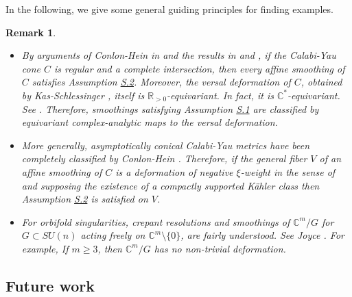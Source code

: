 \documentclass[a4paper,11pt]{article}
\newcounter{mythm}[section]
\newtheorem{rem}[mythm]{Remark}
\def\C{\mathbb{C}}
\def\R{\mathbb{R}}
\begin{document}
In the following, we give some general guiding principles for finding examples.
\begin{rem} \label{rem ex}
\hfill
\begin{itemize}
\item By arguments of Conlon-Hein in \cite[Section 5.1]{conlon2013asymptotically} and the results in \cite[Theorem A]{conlon2015asymptotically} and \cite[Theorem A, Theroem B]{conlon_classification_2024}, if the Calabi-Yau cone $C$ is regular and a complete intersection, then every affine smoothing of $C$ satisfies Assumption \hyperlink{S.2}{S.2}. Moreover, the versal deformation of $C$, obtained by Kas-Schlessinger \cite{KasSchlessinger}, itself is $\R_{>0}$-equivariant. In fact, it is $\C^*$-equivariant. See \cite[Theorem 2.5, remark 1) p.12-13]{MR584445}. Therefore, smoothings satisfying Assumption \hyperlink{S.1}{S.1} are classified by equivariant complex-analytic maps to the versal deformation.
\item More generally, asymptotically conical Calabi-Yau metrics have been completely classified by Conlon-Hein \cite{conlon_classification_2024}. Therefore, if the general fiber $V$ of an affine smoothing of $C$ is a deformation of negative $\xi$-weight in the sense of \cite[Definition 1.7]{conlon_classification_2024} and supposing the existence of a compactly supported Kähler class then Assumption \hyperlink{S.2}{S.2} is satisfied on $V$.
\item For orbifold singularities, crepant resolutions and smoothings of $\C^m /G$ for $G \subset SU(n)$ acting freely on $\C^m \setminus \{ 0\}$, are fairly understood. See Joyce \cite[Section 6.4]{joyce2000compact}. For example, If $m \geq 3$, then $\C^m /G$ has no non-trivial deformation.
    \end{itemize}
\end{rem}

\subsection{Future work}
\end{document}
